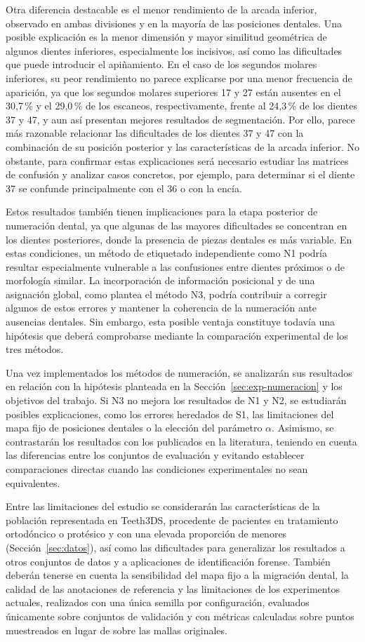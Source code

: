 Otra diferencia destacable es el menor rendimiento de la arcada inferior, observado en ambas divisiones y en la mayoría de las posiciones dentales. Una posible explicación es la menor dimensión y mayor similitud geométrica de algunos dientes inferiores, especialmente los incisivos, así como las dificultades que puede introducir el apiñamiento. En el caso de los segundos molares inferiores, su peor rendimiento no parece explicarse por una menor frecuencia de aparición, ya que los segundos molares superiores 17 y 27 están ausentes en el 30{,}7\,\% y el 29{,}0\,\% de los escaneos, respectivamente, frente al 24{,}3\,\% de los dientes 37 y 47, y aun así presentan mejores resultados de segmentación. Por ello, parece más razonable relacionar las dificultades de los dientes 37 y 47 con la combinación de su posición posterior y las características de la arcada inferior. No obstante, para confirmar estas explicaciones será necesario estudiar las matrices de confusión y analizar casos concretos, por ejemplo, para determinar si el diente 37 se confunde principalmente con el 36 o con la encía.

Estos resultados también tienen implicaciones para la etapa posterior de numeración dental, ya que algunas de las mayores dificultades se concentran en los dientes posteriores, donde la presencia de piezas dentales es más variable. En estas condiciones, un método de etiquetado independiente como N1 podría resultar especialmente vulnerable a las confusiones entre dientes próximos o de morfología similar. La incorporación de información posicional y de una asignación global, como plantea el método N3, podría contribuir a corregir algunos de estos errores y mantener la coherencia de la numeración ante ausencias dentales. Sin embargo, esta posible ventaja constituye todavía una hipótesis que deberá comprobarse mediante la comparación experimental de los tres métodos.

Una vez implementados los métodos de numeración, se analizarán sus resultados en relación con la hipótesis planteada en la Sección~\ref{sec:exp-numeracion} y los objetivos del trabajo. Si N3 no mejora los resultados de N1 y N2, se estudiarán posibles explicaciones, como los errores heredados de S1, las limitaciones del mapa fijo de posiciones dentales o la elección del parámetro $\alpha$. Asimismo, se contrastarán los resultados con los publicados en la literatura, teniendo en cuenta las diferencias entre los conjuntos de evaluación y evitando establecer comparaciones directas cuando las condiciones experimentales no sean equivalentes. 

Entre las limitaciones del estudio se considerarán las características de la población representada en Teeth3DS, procedente de pacientes en tratamiento ortodóncico o protésico y con una elevada proporción de menores (Sección~\ref{sec:datos}), así como las dificultades para generalizar los resultados a otros conjuntos de datos y a aplicaciones de identificación forense. También deberán tenerse en cuenta la sensibilidad del mapa fijo a la migración dental, la calidad de las anotaciones de referencia y las limitaciones de los experimentos actuales, realizados con una única semilla por configuración, evaluados únicamente sobre conjuntos de validación y con métricas calculadas sobre puntos muestreados en lugar de sobre las mallas originales.